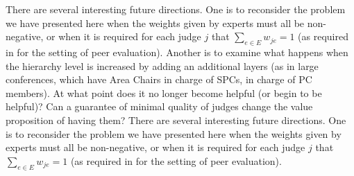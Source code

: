 \documentclass[letterpaper]{article} %
\newtheorem{example}{Example}
\newcommand{\judge}{\ensuremath{j} }
\newcommand{\experts}{\ensuremath{E} }
\newcommand{\expert}{\ensuremath{e} }
\newcommand{\nick}[1]{\todo[color=kentuckyblue!40,size=footnotesize]{Nick says: #1}}
\begin{document}
There are several interesting future directions. One is to reconsider the problem we have presented here when the weights given by experts must all be non-negative, or when it is required for each judge $\judge$ that $\sum_{\expert \in \experts} w_{\judge \expert} = 1$ (as required in \citet{ALMRW16,ALMRW19} for the setting of peer evaluation). Another is to examine what happens when the hierarchy level is increased by adding an additional layers (as in large conferences, which have Area Chairs in charge of SPCs, in charge of PC members). At what point does it no longer become helpful (or begin to be helpful)? Can a guarantee of minimal quality of judges change the value proposition of having them?%
There are several interesting future directions. One is to reconsider the problem we have presented here when the weights given by experts must all be non-negative, or when it is required for each judge $\judge$ that $\sum_{\expert \in \experts} w_{\judge \expert} = 1$ (as required in \citet{ALMRW16,ALMRW19} for the setting of peer evaluation). 

 


\end{document}
